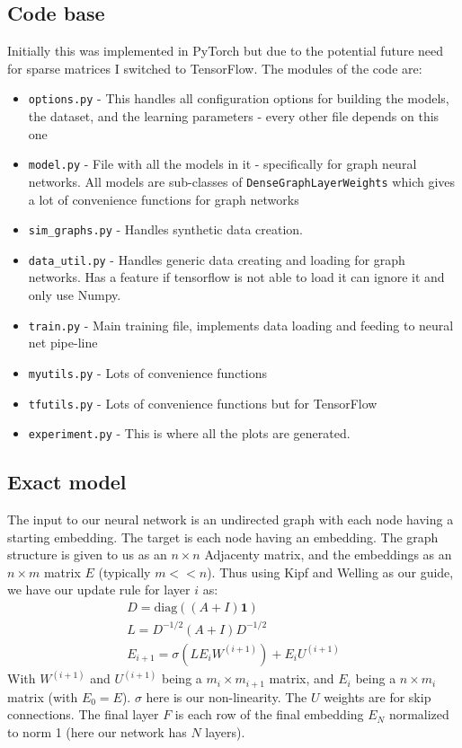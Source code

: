 \documentclass[a4paper]{article}
\begin{document}
\subsection*{Code base}
Initially this was implemented in PyTorch but due to the potential future need for sparse matrices I switched to TensorFlow. The modules of the code are:
\begin{itemize}
\item \texttt{options.py} - This handles all configuration options for building the models, the dataset, and the learning parameters - every other file depends on this one
\item \texttt{model.py} - File with all the models in it - specifically for graph neural networks. All models are sub-classes of \texttt{DenseGraphLayerWeights} which gives a lot of convenience functions for graph networks
\item \texttt{sim\_graphs.py} - Handles synthetic data creation.
\item \texttt{data\_util.py} - Handles generic data creating and loading for graph networks. Has a feature if tensorflow is not able to load it can ignore it and only use Numpy.
\item \texttt{train.py} - Main training file, implements data loading and feeding to neural net pipe-line
\item \texttt{myutils.py} - Lots of convenience functions
\item \texttt{tfutils.py} - Lots of convenience functions but for TensorFlow
\item \texttt{experiment.py} - This is where all the plots are generated. 
\end{itemize}

\subsection*{Exact model}
The input to our neural network is an undirected graph with each node having a starting embedding. The target is each node having an embedding. The graph structure is given to us as an $n \times n$ Adjacenty matrix, and the embeddings as an $n \times m$ matrix $E$ (typically $m << n$). Thus using Kipf and Welling as our guide, we have our update rule for layer $i$ as:
\begin{align*}
D = \mathrm{diag}((A + I) \mathbf{1}) \\
L = D^{-1/2}(A + I)D^{-1/2} \\
E_{i+1} = \sigma \left(LE_{i} W^{(i+1)}\right) + E_{i} U^{(i+1)}
\end{align*}
With $W^{(i+1)}$ and $U^{(i+1)}$ being a $m_i \times m_{i+1}$ matrix, and $E_i$ being a $n \times m_i$ matrix (with $E_0 = E$). $\sigma$ here is our non-linearity. The $U$ weights are for skip connections. The final layer $F$ is each row of the final embedding $E_N$ normalized to norm 1 (here our network has $N$ layers).
\end{document}
